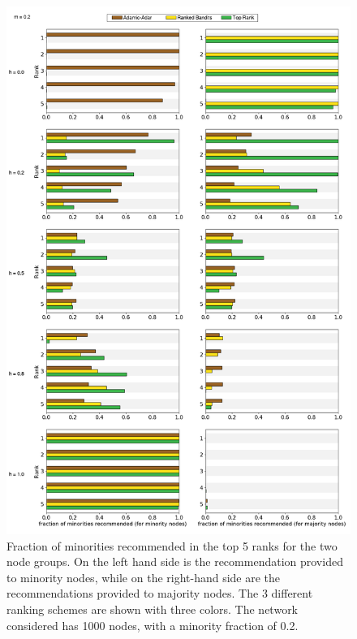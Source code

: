 \begin{figure}
	\includegraphics[scale=0.28]{images/proposal_figure_3_3}
	\caption{Fraction of minorities recommended in the top 5 ranks for the two node groups. On the left hand side is the recommendation provided to minority nodes, while on the right-hand side are the recommendations provided to majority nodes. The 3 different ranking schemes are shown with three colors. The network considered has 1000 nodes, with a minority fraction of 0.2.}
	\label{fig-rank_3}
\end{figure}

